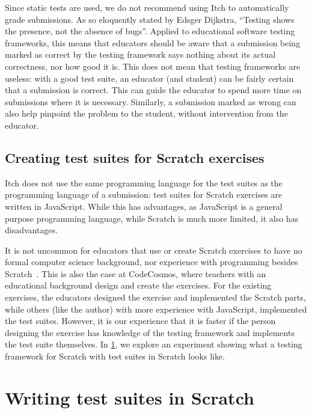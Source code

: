 \documentclass[../main]{subfiles}
\begin{document}
Since static tests are used, we do not recommend using Itch to automatically grade submissions.
As so eloquently stated by Edsger Dijkstra, ``Testing shows the presence, not the absence of bugs''.
Applied to educational software testing frameworks, this means that educators should be aware that a submission being marked as correct by the testing framework says nothing about its actual correctness, nor how good it is.
This does not mean that testing frameworks are useless: with a good test suite, an educator (and student) can be fairly certain that a submission is correct.
This can guide the educator to spend more time on submissions where it is necessary.
Similarly, a submission marked as wrong can also help pinpoint the problem to the student, without intervention from the educator.

\subsection{Creating test suites for Scratch exercises}\label{subsec:creating-test-suites-for-scratch-exercises}

Itch does not use the same programming language for the test suites as the programming language of a submission: test suites for Scratch exercises are written in JavaScript.
While this has advantages, as JavaScript is a general purpose programming language, while Scratch is much more limited, it also has disadvantages.

It is not uncommon for educators that use or create Scratch exercises to have no formal computer science background, nor experience with programming besides Scratch~\autocite{kimEnhancingTeachersICT2012,oliveiraIntroductionComputationalThinking2019}.
This is also the case at CodeCosmos, where teachers with an educational background design and create the exercises.
For the existing exercises, the educators designed the exercise and implemented the Scratch parts, while others (like the author) with more experience with JavaScript, implemented the test suites.
However, it is our experience that it is faster if the person designing the exercise has knowledge of the testing framework and implements the test suite themselves.
In \cref{sec:poke:-a-testing-framework-written-in-scratch}, we explore an experiment showing what a testing framework for Scratch with test suites in Scratch looks like.

\section{Writing test suites in Scratch}\label{sec:poke:-a-testing-framework-written-in-scratch}
\end{document}
